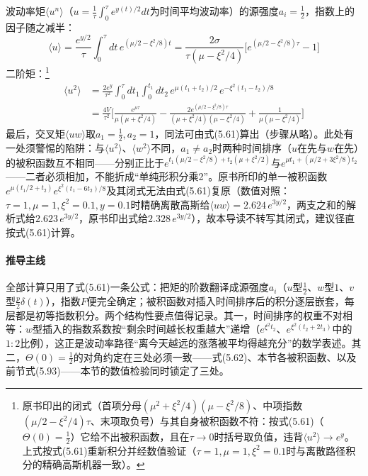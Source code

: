 波动率矩$\langle u^{n}\rangle$（$u=\frac{1}{\tau}\int_0^{\tau}e^{y(t)/2}dt$为时间平均波动率）的源强度$a_i=\frac{1}{2}$，指数上的因子随之减半：
\begin{equation*}
\langle u\rangle=\frac{e^{y/2}}{\tau}\int_{0}^{\tau}dt\,e^{(\mu/2-\xi^{2}/8)t}
=\frac{2\sigma}{\tau(\mu-\xi^{2}/4)}
\bigl[e^{(\mu/2-\xi^{2}/8)\tau}-1\bigr]
\end{equation*}
二阶矩：\footnote{原书印出的闭式（首项分母$(\mu^{2}+\xi^{2}/4)(\mu-\xi^{2}/8)$、中项指数$(\mu/2-\xi^{2}/4)\tau$、末项取负号）与其自身被积函数不符：按式(5.61)（$\Theta(0)=\frac{1}{2}$）它给不出被积函数，且在$\tau\to0$时括号取负值，违背$\langle u^{2}\rangle\to e^{y}$。上式按式(5.61)重新积分并经数值验证（$\tau=1,\mu=1,\xi^{2}=0.1$时与离散路径积分的精确高斯机器一致）。}
\begin{align*}
\langle u^{2}\rangle&=\frac{2e^{y}}{\tau^{2}}\int_{0}^{\tau}dt_1\int_{0}^{t_1}dt_2\,
e^{\mu(t_1+t_2)/2}\,e^{-\xi^{2}(t_1-t_2)/8}\\
&=\frac{4V}{\tau^{2}}\biggl[
\frac{e^{\mu\tau}}{\mu(\mu+\xi^{2}/4)}
-\frac{2e^{(\mu/2-\xi^{2}/8)\tau}}{(\mu+\xi^{2}/4)(\mu-\xi^{2}/4)}
+\frac{1}{\mu(\mu-\xi^{2}/4)}\biggr]
\end{align*}最后，交叉矩$\langle uw\rangle$取$a_1=\frac{1}{2},a_2=1$，同法可由式(5.61)算出（步骤从略）。此处有一处须警惕的陷阱：与$\langle u^{2}\rangle$、$\langle w^{2}\rangle$不同，$a_1\neq a_2$时两种时间排序（$u$在先与$w$在先）的被积函数互不相同——分别正比于$e^{t_1(\mu/2-\xi^{2}/8)+t_2(\mu+\xi^{2}/2)}$与$e^{\mu t_1+(\mu/2+3\xi^{2}/8)t_2}$——二者必须相加，不能折成“单纯形积分乘2”。原书所印的单一被积函数$e^{\mu(t_1/2+t_2)}e^{\xi^{2}(t_1-6t_2)/8}$及其闭式无法由式(5.61)复原（数值对照：$\tau=1,\mu=1,\xi^{2}=0.1,y=0.1$时精确离散高斯给$\langle uw\rangle=2.624\,e^{3y/2}$，两支之和的解析式给$2.623\,e^{3y/2}$，原书印出式给$2.328\,e^{3y/2}$），故本导读不转写其闭式，建议径直按式(5.61)计算。

\paragraph{推导主线}
全部计算只用了式(5.61)一条公式：把矩的阶数翻译成源强度$a_i$（$u$型$\frac{1}{2}$、$w$型$1$、$v$型$\frac{p}{2}\delta(t)$），指数$F$便完全确定；被积函数对插入时间排序后的积分逐层嵌套，每层都是初等指数积分。两个结构性要点值得记录。其一，时间排序的权重不对相等：$w$型插入的指数系数按“剩余时间越长权重越大”递增（$e^{\xi^{2}t_2}$、$e^{\xi^{2}(t_2+2t_3)}$中的$1:2$比例），这正是波动率路径“离今天越远的涨落被平均得越充分”的数学表述。其二，$\Theta(0)=\frac{1}{2}$的对角约定在三处必须一致——式(5.62)、本节各被积函数、以及前节式(5.93)——本节的数值检验同时锁定了三处。

